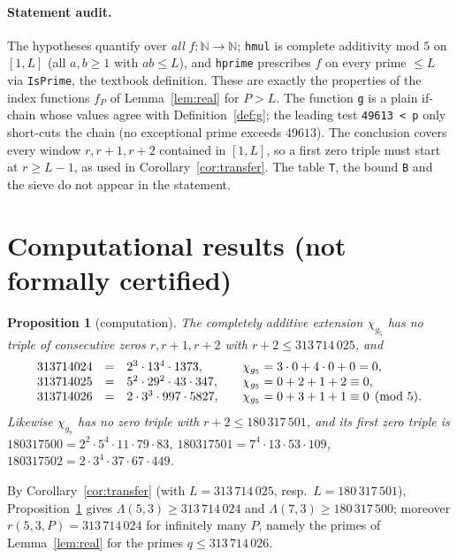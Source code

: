 \documentclass[11pt]{article}
\numberwithin{equation}{section}
\newtheorem{proposition}[theorem]{Proposition}
\theoremstyle{definition}
\theoremstyle{remark}
\newcommand{\N}{\mathbb N}
\begin{document}
\paragraph{Statement audit.} The hypotheses quantify over \emph{all} $f:\N\to\N$; \texttt{hmul} is
complete additivity mod $5$ on $[1,L]$ (all $a,b\ge1$ with $ab\le L$), and \texttt{hprime} prescribes
$f$ on every prime $\le L$ via \texttt{IsPrime}, the textbook definition. These are exactly the
properties of the index functions $f_P$ of Lemma~\ref{lem:real} for $P>L$. The function \texttt{g} is a
plain if-chain whose values agree with Definition~\ref{def:g}; the leading test \texttt{49613 < p} only
short-cuts the chain (no exceptional prime exceeds $49613$). The conclusion covers every window
$r,r+1,r+2$ contained in $[1,L]$, so a first zero triple must start at $r\ge L-1$, as used in
Corollary~\ref{cor:transfer}. The table \texttt{T}, the bound \texttt{B} and the sieve do not appear in the
statement.

\section{Computational results (not formally certified)}\label{sec:comp}

\begin{proposition}[computation]\label{prop:comp}
The completely additive extension $\chi_{g_5}$ has no triple of consecutive zeros $r,r+1,r+2$ with
$r+2\le313\,714\,025$, and
\[
\begin{array}{rcl@{\qquad}l}
313714024 &=& 2^3\cdot13^4\cdot1373, & \chi_{g_5}=3\cdot0+4\cdot0+0=0,\\
313714025 &=& 5^2\cdot29^2\cdot43\cdot347, & \chi_{g_5}=0+2+1+2\equiv0,\\
313714026 &=& 2\cdot3^3\cdot997\cdot5827, & \chi_{g_5}=0+3+1+1\equiv0 \pmod5.
\end{array}
\]
Likewise $\chi_{g_7}$ has no zero triple with $r+2\le180\,317\,501$, and its first zero triple is
$180317500=2^2\cdot5^4\cdot11\cdot79\cdot83$, $180317501=7^4\cdot13\cdot53\cdot109$,
$180317502=2\cdot3^4\cdot37\cdot67\cdot449$.
\end{proposition}

By Corollary~\ref{cor:transfer} (with $L=313\,714\,025$, resp.\ $L=180\,317\,501$), Proposition~\ref{prop:comp} gives $\Lambda(5,3)\ge313\,714\,024$ and
$\Lambda(7,3)\ge180\,317\,500$; moreover $r(5,3,P)=313\,714\,024$ for infinitely many $P$, namely the primes
of Lemma~\ref{lem:real} for the primes $q\le313\,714\,026$.
\end{document}
